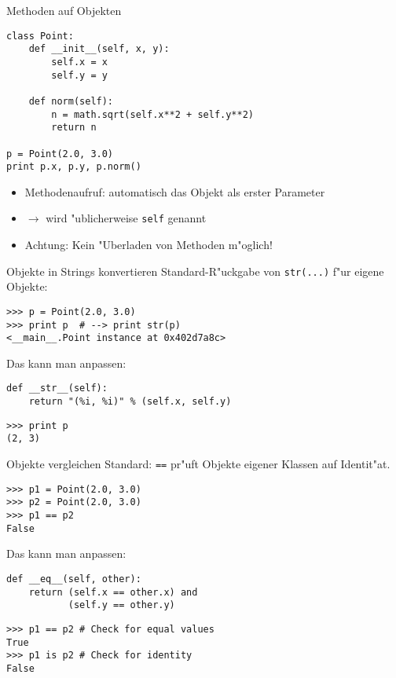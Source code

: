 \begin{frame}[fragile]{Methoden auf Objekten}
\begin{lstlisting}[style=Python]
class Point:
    def __init__(self, x, y):
        self.x = x
        self.y = y

    def norm(self):
        n = math.sqrt(self.x**2 + self.y**2)
        return n

p = Point(2.0, 3.0)
print p.x, p.y, p.norm()
\end{lstlisting}
\begin{itemize}
\item Methodenaufruf: automatisch das Objekt als erster Parameter
\item $\rightarrow$ wird "ublicherweise \lstinline{self} genannt
\item\alert{Achtung}: Kein "Uberladen von Methoden m"oglich!
\end{itemize}
\end{frame}

\begin{frame}[fragile]{Objekte in Strings konvertieren}
Standard-R"uckgabe von \lstinline{str(...)} f"ur eigene Objekte:
\begin{lstlisting}[style=Shell]
>>> p = Point(2.0, 3.0)
>>> print p  # --> print str(p)
<__main__.Point instance at 0x402d7a8c>
\end{lstlisting}
\vspace{2mm}

Das kann man anpassen:
\begin{lstlisting}[style=Python]
def __str__(self):
    return "(%i, %i)" % (self.x, self.y)
\end{lstlisting}
\begin{lstlisting}[style=Shell]
>>> print p
(2, 3)
 \end{lstlisting}
\end{frame}

\begin{frame}[fragile]{Objekte vergleichen}
Standard: \texttt{==} pr"uft Objekte eigener Klassen auf Identit"at.
\begin{lstlisting}[style=Shell]
>>> p1 = Point(2.0, 3.0)
>>> p2 = Point(2.0, 3.0)
>>> p1 == p2
False
\end{lstlisting}
Das kann man anpassen:
\begin{lstlisting}[style=Python]
def __eq__(self, other):
    return (self.x == other.x) and
           (self.y == other.y)
\end{lstlisting}
\begin{lstlisting}[style=Shell]
>>> p1 == p2 # Check for equal values
True
>>> p1 is p2 # Check for identity
False
\end{lstlisting}
\end{frame}

